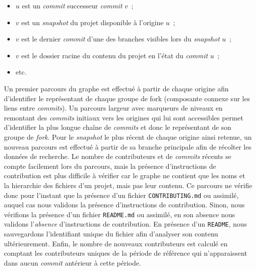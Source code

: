 \documentclass[dvipsnames,runningheads]{llncs}
\newcommand{\en}[1]{\foreignlanguage{english}{\emph{#1}}}
\begin{document}
    \begin{itemize}
        \item $u$ est un \en{commit} successeur \en{commit} $v$ ;
        \item $v$ est un \en{snapshot} du projet disponible à l'origine $u$ ;
        \item $v$ est le dernier \en{commit} d'une des branches visibles lors du \en{snapshot} $u$ ;
        \item $v$ est le dossier racine du contenu du projet en l'état du \en{commit} $u$ ;
        \item etc.
    \end{itemize}

    Un premier parcours du graphe est effectué à partir de chaque origine afin d'identifier le représentant de
    chaque groupe de fork (composante connexe sur les liens entre \en{commits}). Un parcours largeur avec
    marqueurs de niveaux en remontant des \en{commits} initiaux vers les origines qui lui sont accessibles
    permet d'identifier la plus longue chaîne de \en{commits} et donc le représentant de son groupe de
    \en{fork}. Pour le \en{snapshot} le plus récent de chaque origine ainsi retenue, un nouveau parcours est
    effectué à partir de sa branche principale afin de récolter les données de recherche. Le nombre de
    contributeurs et de \en{commits} récents se compte facilement lors du parcours, mais la présence
    d'instructions de contribution est plus difficile à vérifier car le graphe ne contient que les noms et la
    hierarchie des fichiers d'un projet, mais pas leur contenu. Ce parcours ne vérifie donc pour l'instant que
    la présence d'un fichier \texttt{CONTRIBUTING.md} ou assimilé, auquel cas nous validons la présence
    d'instructions de contribution. Sinon, nous vérifions la présence d'un fichier \texttt{README.md} ou
    assimilé, en son absence nous validons l'\emph{absence} d'instructions de contribution. En présence d'un
    \texttt{README}, nous sauvegardons l'identifiant unique du fichier afin d'analyser son contenu
    ultérieurement. Enfin, le nombre de nouveaux contributeurs est calculé en comptant les contributeurs
    uniques de la période de référence qui n'apparaissent dans aucun \en{commit} antérieur à cette période.
\end{document}
